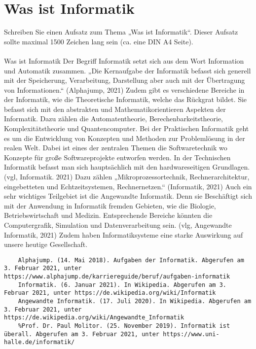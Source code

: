 \section{Was ist Informatik}
Schreiben Sie einen Aufsatz zum Thema „Was ist Informatik“. Dieser Aufsatz sollte maximal 1500 Zeichen lang sein (ca. eine DIN A4 Seite).\\
\\
Was ist Informatik	
Der Begriff Informatik setzt sich aus dem Wort Information und Automatik zusammen. „Die Kernaufgabe der Informatik befasst sich generell mit der Speicherung, Verarbeitung, Darstellung aber auch mit der Übertragung von Informationen.“ (Alphajump, 2021) 
Zudem gibt es verschiedene Bereiche in der Informatik, wie die 
Theoretische Informatik, welche das Rückgrat bildet. Sie befasst sich mit den abstrakten und Mathematikorientieren Aspekten der Informatik. Dazu zählen die Automatentheorie, Berechenbarkeitstheorie, Komplexitätstheorie und Quantencomputer. 
Bei der Praktischen Informatik geht es um die Entwicklung von Konzepten und Methoden zur Problemlösung in der realen Welt. Dabei ist eines der zentralen Themen die Softwaretechnik wo Konzepte für große Softwareprojekte entworfen werden. 
In der Technischen Informatik befasst man sich hauptsächlich mit den hardwareseitigen Grundlagen. (vgl, Informatik. 2021) Dazu zählen „Mikroprozessortechnik, Rechnerarchitektur, eingebetteten und Echtzeitsystemen, Rechnernetzen.“ (Informatik, 2021) 
Auch ein sehr wichtiges Teilgebiet ist die Angewandte Informatik. Denn sie Beschäftigt sich mit der Anwendung in Informatik fremden Gebieten, wie die Biologie, Betriebswirtschaft und Medizin. Entsprechende Bereiche könnten die Computergrafik, Simulation und Datenverarbeitung sein.
(vlg, Angewandte Informatik, 2021) Zudem haben Informatiksysteme eine starke Auswirkung auf unsere heutige Gesellschaft. 


\begin{lstlisting}
	Alphajump. (14. Mai 2018). Aufgaben der Informatik. Abgerufen am 3. Februar 2021, unter https://www.alphajump.de/karriereguide/beruf/aufgaben-informatik
	Informatik. (6. Januar 2021). In Wikipedia. Abgerufen am 3. Februar 2021, unter https://de.wikipedia.org/wiki/Informatik
	Angewandte Informatik. (17. Juli 2020). In Wikipedia. Abgerufen am 3. Februar 2021, unter https://de.wikipedia.org/wiki/Angewandte_Informatik
	%Prof. Dr. Paul Molitor. (25. November 2019). Informatik ist überall. Abgerufen am 3. Februar 2021, unter https://www.uni-halle.de/informatik/
\end{lstlisting}